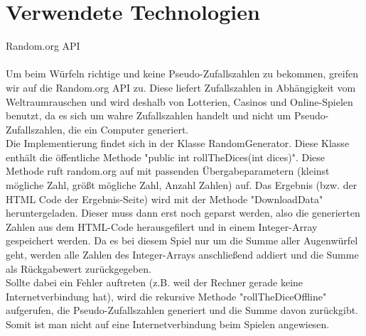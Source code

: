 \chapter{Verwendete Technologien}  

Random.org API\\ \\

Um beim Würfeln richtige und keine Pseudo-Zufallszahlen zu bekommen, greifen wir auf die Random.org API zu. Diese liefert Zufallszahlen in Abhängigkeit vom Weltraumrauschen und wird deshalb von Lotterien, Casinos und Online-Spielen benutzt, da es sich um wahre Zufallszahlen handelt und nicht um Pseudo-Zufallszahlen, die ein Computer generiert.\\
Die Implementierung findet sich in der Klasse RandomGenerator. Diese Klasse enthält die öffentliche Methode "public int rollTheDices(int dices)". Diese Methode ruft random.org auf mit passenden Übergabeparametern (kleinst mögliche Zahl, größt mögliche Zahl, Anzahl Zahlen) auf. Das Ergebnis (bzw. der HTML Code der Ergebnis-Seite) wird mit der Methode "DownloadData" heruntergeladen. Dieser muss dann erst noch geparst werden, also die generierten Zahlen aus dem HTML-Code herausgefilert und in einem Integer-Array gespeichert werden. Da es bei diesem Spiel nur um die Summe aller Augenwürfel geht, werden alle Zahlen des Integer-Arrays anschließend addiert und die Summe als Rückgabewert zurückgegeben.\\
Sollte dabei ein Fehler auftreten (z.B. weil der Rechner gerade keine Internetverbindung hat), wird die rekursive Methode "rollTheDiceOffline" aufgerufen, die Pseudo-Zufallszahlen generiert und die Summe davon zurückgibt. Somit ist man nicht auf eine Internetverbindung beim Spielen angewiesen.